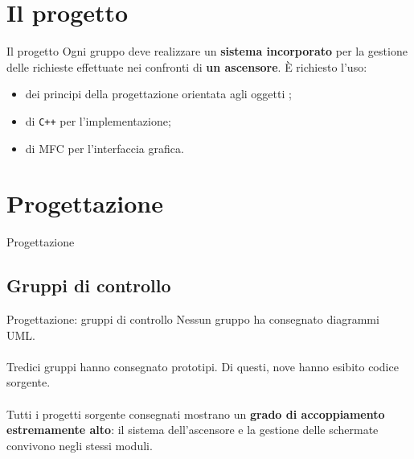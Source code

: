 \documentclass{beamer}
\begin{document}
\section{Il progetto}
\begin{frame}{Il progetto}
	Ogni gruppo deve realizzare un \textbf{sistema incorporato} per la gestione
	delle richieste effettuate nei confronti di \textbf{un ascensore}. È richiesto
	l'uso:
	\begin{itemize}
		\item dei principi della progettazione orientata agli oggetti
		      \autocite{booch};
		\item di \texttt{C++} per l'implementazione;
		\item di MFC per l'interfaccia grafica.
	\end{itemize}
\end{frame}

\section{Progettazione}
\begin{frame}
	\vfill
	\centering
	Progettazione
	\vfill
\end{frame}

\subsection{Gruppi di controllo}
\begin{frame}{Progettazione: gruppi di controllo}
	Nessun gruppo ha consegnato diagrammi UML.
	\\~\\
	Tredici gruppi hanno consegnato prototipi. Di questi, nove hanno esibito
	codice sorgente.
	\\~\\
	Tutti i progetti sorgente consegnati mostrano un \textbf{grado di
		accoppiamento estremamente alto}: il sistema dell'ascensore e la gestione
	delle schermate convivono negli stessi moduli.
\end{frame}
\end{document}
